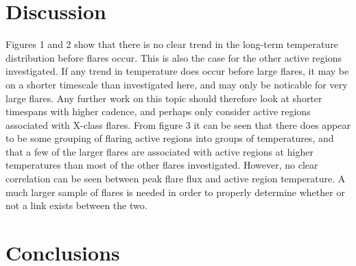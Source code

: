 \documentclass{article}
\begin{document}
\section{Discussion}
Figures 1 and 2 show that there is no clear trend in the long-term temperature distribution before flares occur.
This is also the case for the other active regions investigated. If any trend in temperature does occur before large flares, it may be on a shorter timescale than investigated here, and may only be noticable for very large flares.
Any further work on this topic should therefore look at shorter timespans with higher cadence, and perhaps only consider active regions associated with X-class flares.
From figure 3 it can be seen that there does appear to be some grouping of flaring active regions into groups of temperatures, and that a few of the larger flares are associated with active regions at higher temperatures than most of the other flares investigated.
However, no clear correlation can be seen between peak flare flux and active region temperature.
A much larger sample of flares is needed in order to properly determine whether or not a link exists between the two.

\section{Conclusions}



\end{document}
